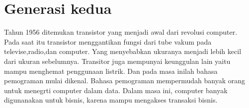 \section{Generasi kedua}
Tahun 1956 ditemukan transistor yang menjadi awal dari revolusi computer. Pada saat itu transistor menggantikan fungsi dari tube vakum pada televise,radio,dan computer. Yang menyebabkan ukuranya menjadi lebih kecil dari ukuran sebelumnya. Transitor juga mempunyai keunggulan lain yaitu mampu menghemat penggunaan listrik.
Dan pada masa inilah bahasa pemograman mulai dikenal. Bahasa pemograman mempermudah banyak orang untuk menegrti computer dalam data. Dalam masa ini, computer banyak digunanakan untuk bisnis, karena mampu mengakses transaksi bisnis.
